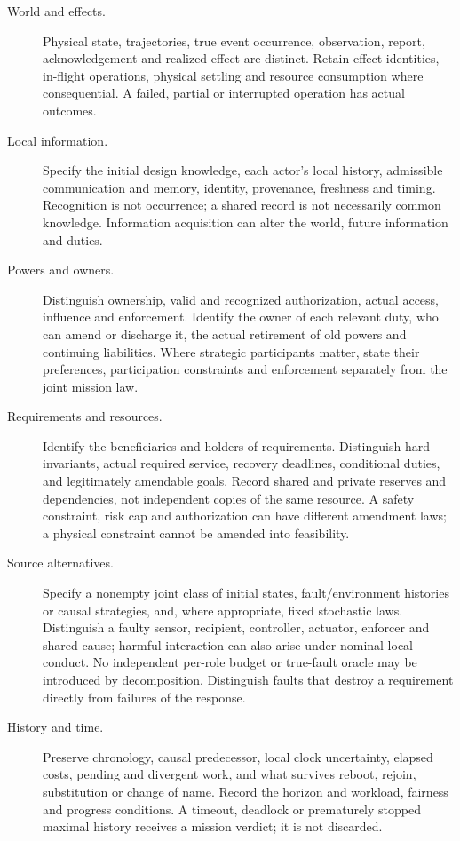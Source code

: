 \documentclass[11pt]{article}
\begin{document}
\begin{description}
\item[World and effects.] Physical state, trajectories, true event occurrence, observation, report, acknowledgement and realized effect are distinct. Retain effect identities, in-flight operations, physical settling and resource consumption where consequential. A failed, partial or interrupted operation has actual outcomes.
\item[Local information.] Specify the initial design knowledge, each actor's local history, admissible communication and memory, identity, provenance, freshness and timing. Recognition is not occurrence; a shared record is not necessarily common knowledge. Information acquisition can alter the world, future information and duties.
\item[Powers and owners.] Distinguish ownership, valid and recognized authorization, actual access, influence and enforcement. Identify the owner of each relevant duty, who can amend or discharge it, the actual retirement of old powers and continuing liabilities. Where strategic participants matter, state their preferences, participation constraints and enforcement separately from the joint mission law.
\item[Requirements and resources.] Identify the beneficiaries and holders of requirements. Distinguish hard invariants, actual required service, recovery deadlines, conditional duties, and legitimately amendable goals. Record shared and private reserves and dependencies, not independent copies of the same resource. A safety constraint, risk cap and authorization can have different amendment laws; a physical constraint cannot be amended into feasibility.
\item[Source alternatives.] Specify a nonempty joint class of initial states, fault/environment histories or causal strategies, and, where appropriate, fixed stochastic laws. Distinguish a faulty sensor, recipient, controller, actuator, enforcer and shared cause; harmful interaction can also arise under nominal local conduct. No independent per-role budget or true-fault oracle may be introduced by decomposition. Distinguish faults that destroy a requirement directly from failures of the response.
\item[History and time.] Preserve chronology, causal predecessor, local clock uncertainty, elapsed costs, pending and divergent work, and what survives reboot, rejoin, substitution or change of name. Record the horizon and workload, fairness and progress conditions. A timeout, deadlock or prematurely stopped maximal history receives a mission verdict; it is not discarded.
\end{description}
\end{document}
